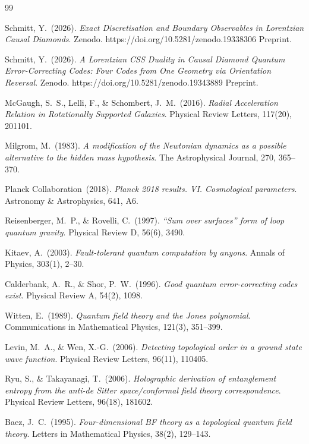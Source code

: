 \documentclass[12pt,a4paper]{article}
\theoremstyle{plain}
\theoremstyle{definition}
\begin{document}

\begin{thebibliography}{99}

Schmitt, Y.\ (2026).
\emph{Exact Discretisation and Boundary Observables in Lorentzian Causal
Diamonds}. Zenodo. https://doi.org/10.5281/zenodo.19338306
Preprint.

Schmitt, Y.\ (2026).
\emph{A Lorentzian CSS Duality in Causal Diamond Quantum Error-Correcting Codes:
Four Codes from One Geometry via Orientation Reversal}. Zenodo. https://doi.org/10.5281/zenodo.19343889
Preprint.

McGaugh, S.~S., Lelli, F., \& Schombert, J.~M.\ (2016).
\emph{Radial Acceleration Relation in Rotationally Supported Galaxies}.
Physical Review Letters, 117(20), 201101.

Milgrom, M.\ (1983).
\emph{A modification of the Newtonian dynamics as a possible alternative
to the hidden mass hypothesis}.
The Astrophysical Journal, 270, 365--370.

Planck Collaboration\ (2018).
\emph{Planck 2018 results. VI. Cosmological parameters}.
Astronomy \& Astrophysics, 641, A6.

Reisenberger, M.~P., \& Rovelli, C.\ (1997).
\emph{``Sum over surfaces'' form of loop quantum gravity}.
Physical Review D, 56(6), 3490.

Kitaev, A.\ (2003).
\emph{Fault-tolerant quantum computation by anyons}.
Annals of Physics, 303(1), 2--30.

Calderbank, A.~R., \& Shor, P.~W.\ (1996).
\emph{Good quantum error-correcting codes exist}.
Physical Review A, 54(2), 1098.

Witten, E.\ (1989).
\emph{Quantum field theory and the Jones polynomial}.
Communications in Mathematical Physics, 121(3), 351--399.

Levin, M.~A., \& Wen, X.-G.\ (2006).
\emph{Detecting topological order in a ground state wave function}.
Physical Review Letters, 96(11), 110405.

Ryu, S., \& Takayanagi, T.\ (2006).
\emph{Holographic derivation of entanglement entropy from the anti-de
Sitter space/conformal field theory correspondence}.
Physical Review Letters, 96(18), 181602.

Baez, J.~C.\ (1995).
\emph{Four-dimensional BF theory as a topological quantum field theory}.
Letters in Mathematical Physics, 38(2), 129--143.


\end{thebibliography}
\end{document}
